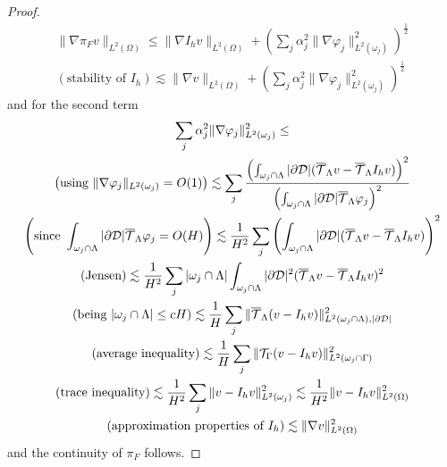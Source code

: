 \begin{proof}
\begin{multline*}
\|\nabla \pi_F v \|_{L^2(\Omega)} \leq \|\nabla I_h v\|_{L^2(\Omega)} + \left(\sum_j\alpha_j^2\|\nabla \varphi _j\|^2_{L^2(\omega_j)}\right)^{\frac 12}\\
(\text{stability of }I_h)\lesssim   \|\nabla  v\|_{L^2(\Omega)} + \left(\sum_j\alpha_j^2\|\nabla \varphi _j\|^2_{L^2(\omega_j)}\right)^{\frac 12}
\end{multline*}
and for the second term 
\begin{multline*}
\sum_j \alpha_j ^2\|\nabla \varphi _j\|^2_{L^2(\omega_j)}\leq
\\
\left(\text{using }\|\nabla \varphi _j\|_{{L^2(\omega_j)}}=O(1)\right) \lesssim  \sum_j \frac{\left(\int_{\omega _j\cap \Lambda} |\partial\mathcal{D}| ({\overline{\mathcal{T}}_\Lambda} v-{\overline{\mathcal{T}}_\Lambda} I_h v)\right)^2}{\left(\int_{\omega _j\cap \Lambda}|\partial\mathcal{D}|{\overline{\mathcal{T}}_\Lambda} \varphi_j \right)^2}
\\
\left(\text{since }\int_{\omega _j\cap \Lambda}|\partial\mathcal{D}|{\overline{\mathcal{T}}_\Lambda} \varphi_j=O(H)\right) \lesssim \frac {1}{H^2} \sum_j \left(\int_{\omega _j\cap \Lambda} |\partial\mathcal{D}| ({\overline{\mathcal{T}}_\Lambda} v-{\overline{\mathcal{T}}_\Lambda} I_hv)\right)^2
\\
(\text{Jensen}) \lesssim  \frac {1}{H^2} \sum_j |\omega _j\cap \Lambda| \int_{\omega _j\cap \Lambda} |\partial\mathcal{D}|^2({\overline{\mathcal{T}}_\Lambda} v-{\overline{\mathcal{T}}_\Lambda} I_h v)^2
\\
(\text{being }|\omega _j\cap \Lambda| \leq cH)\lesssim  \frac {1}{H} \sum_j \| {\overline{\mathcal{T}}_\Lambda} (v-I_h v)\|^2_{L^2(\omega _j\cap \Lambda), |\partial\mathcal{D}|}
\\
(\text{average inequality}) \lesssim  \frac {1}{H} \sum_j \| {\mathcal{T}_\Gamma}(v-I_h v)\|^2_{L^2(\omega _j\cap \Gamma)}  
\\
\left(\text{trace inequality} \right)\lesssim  \frac {1}{H^2} \sum_j  \| v-I_h v\|^2_{L^2(\omega_j)} \lesssim  \frac {1}{H^2}  \| v-I_h v\|^2_{L^2(\Omega)} 
\\
(\text{approximation properties of }I_h)\lesssim \|\nabla  v\|^2_{L^2(\Omega)}
\end{multline*}
and the continuity of $\pi_F$ follows.
\end{proof}

